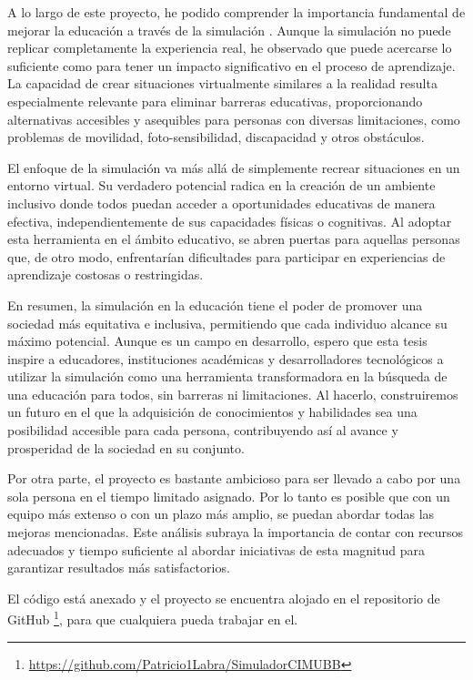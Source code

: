 A lo largo de este proyecto, he podido comprender la importancia fundamental de mejorar la educación a través de la simulación \cite{Simulacion}. Aunque la simulación no puede replicar completamente la experiencia real, he observado que puede acercarse lo suficiente como para tener un impacto significativo en el proceso de aprendizaje. La capacidad de crear situaciones virtualmente similares a la realidad resulta especialmente relevante para eliminar barreras educativas, proporcionando alternativas accesibles y asequibles para personas con diversas limitaciones, como problemas de movilidad, foto-sensibilidad, discapacidad y otros obstáculos.

El enfoque de la simulación va más allá de simplemente recrear situaciones en un entorno virtual. Su verdadero potencial radica en la creación de un ambiente inclusivo donde todos puedan acceder a oportunidades educativas de manera efectiva, independientemente de sus capacidades físicas o cognitivas. Al adoptar esta herramienta en el ámbito educativo, se abren puertas para aquellas personas que, de otro modo, enfrentarían dificultades para participar en experiencias de aprendizaje costosas o restringidas.

En resumen, la simulación en la educación tiene el poder de promover una sociedad más equitativa e inclusiva, permitiendo que cada individuo alcance su máximo potencial. Aunque es un campo en desarrollo, espero que esta tesis inspire a educadores, instituciones académicas y desarrolladores tecnológicos a utilizar la simulación como una herramienta transformadora en la búsqueda de una educación para todos, sin barreras ni limitaciones. Al hacerlo, construiremos un futuro en el que la adquisición de conocimientos y habilidades sea una posibilidad accesible para cada persona, contribuyendo así al avance y prosperidad de la sociedad en su conjunto.

Por otra parte, el proyecto es bastante ambicioso para ser llevado a cabo por una sola persona en el tiempo limitado asignado. Por lo tanto es posible que con un equipo más extenso o con un plazo más amplio, se puedan abordar todas las mejoras mencionadas. Este análisis subraya la importancia de contar con recursos adecuados y tiempo suficiente al abordar iniciativas de esta magnitud para garantizar resultados más satisfactorios.

El código está anexado y el proyecto se encuentra alojado en el repositorio de GitHub \footnote{\url{https://github.com/Patricio1Labra/SimuladorCIMUBB}}, para que cualquiera pueda trabajar en el.